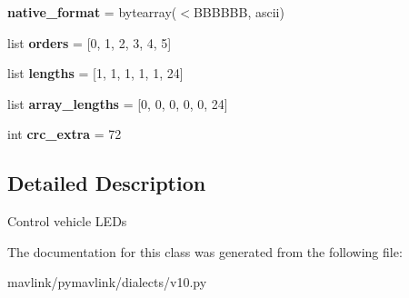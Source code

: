 \begin{DoxyCompactItemize}
\item 
\mbox{\label{classpymavlink_1_1dialects_1_1v10_1_1MAVLink__led__control__message_a8f52b6738a54850581ef74f0d883d92a}} 
{\bfseries native\+\_\+format} = bytearray(\textquotesingle{}$<$B\+B\+B\+B\+BB\textquotesingle{}, \textquotesingle{}ascii\textquotesingle{})
\item 
\mbox{\label{classpymavlink_1_1dialects_1_1v10_1_1MAVLink__led__control__message_add77cf7db168eaed7692c206d6f22c71}} 
list {\bfseries orders} = \mbox{[}0, 1, 2, 3, 4, 5\mbox{]}
\item 
\mbox{\label{classpymavlink_1_1dialects_1_1v10_1_1MAVLink__led__control__message_a22284bc9c4422d61949901f4c47a53f6}} 
list {\bfseries lengths} = \mbox{[}1, 1, 1, 1, 1, 24\mbox{]}
\item 
\mbox{\label{classpymavlink_1_1dialects_1_1v10_1_1MAVLink__led__control__message_a087ff3dcc8f857aecd304badbd8805fd}} 
list {\bfseries array\+\_\+lengths} = \mbox{[}0, 0, 0, 0, 0, 24\mbox{]}
\item 
\mbox{\label{classpymavlink_1_1dialects_1_1v10_1_1MAVLink__led__control__message_a6c1bba53d8e2dcf119a48234d2a20931}} 
int {\bfseries crc\+\_\+extra} = 72
\end{DoxyCompactItemize}


\subsection{Detailed Description}
\begin{DoxyVerb}Control vehicle LEDs
\end{DoxyVerb}
 

The documentation for this class was generated from the following file\+:\begin{DoxyCompactItemize}
\item 
mavlink/pymavlink/dialects/v10.\+py\end{DoxyCompactItemize}
